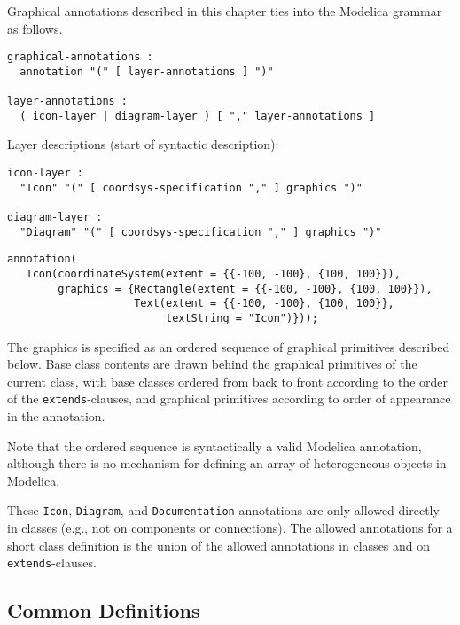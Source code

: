 Graphical annotations described in this chapter ties into the Modelica grammar as follows.
\begin{lstlisting}[language=grammar]
graphical-annotations :
  annotation "(" [ layer-annotations ] ")"

layer-annotations :
  ( icon-layer | diagram-layer ) [ "," layer-annotations ]
\end{lstlisting}
Layer descriptions (start of syntactic description):
\begin{lstlisting}[language=grammar]
icon-layer :
  "Icon" "(" [ coordsys-specification "," ] graphics ")"

diagram-layer :
  "Diagram" "(" [ coordsys-specification "," ] graphics ")"
\end{lstlisting}%

\begin{example}
\begin{lstlisting}[language=modelica]
annotation(
   Icon(coordinateSystem(extent = {{-100, -100}, {100, 100}}),
        graphics = {Rectangle(extent = {{-100, -100}, {100, 100}}),
                    Text(extent = {{-100, -100}, {100, 100}},
                         textString = "Icon")}));
\end{lstlisting}
\end{example}

The graphics is specified as an ordered sequence of graphical primitives described below.
Base class contents are drawn behind the graphical primitives of the current class, with base classes ordered from back to front according to the order of the \lstinline!extends!-clauses, and graphical primitives according to order of appearance in the annotation.

\begin{nonnormative}
Note that the ordered sequence is syntactically a valid Modelica annotation, although there is no mechanism for defining an array of heterogeneous objects in Modelica.
\end{nonnormative}

These \lstinline!Icon!, \lstinline!Diagram!, and \lstinline!Documentation! annotations are only allowed directly in classes (e.g., not on components or connections).
The allowed annotations for a short class definition is the union of the allowed annotations in classes and on \lstinline!extends!-clauses.

\subsection{Common Definitions}\label{common-definitions}


